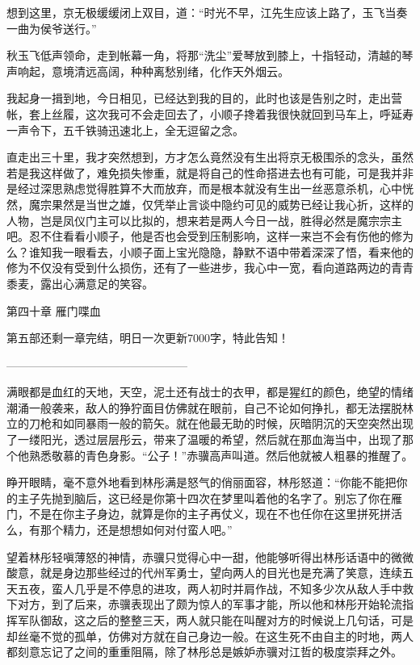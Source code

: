 想到这里，京无极缓缓闭上双目，道：“时光不早，江先生应该上路了，玉飞当奏一曲为侯爷送行。”

秋玉飞低声领命，走到帐幕一角，将那“洗尘”爱琴放到膝上，十指轻动，清越的琴声响起，意境清远高阔，种种离愁别绪，化作天外烟云。

我起身一揖到地，今日相见，已经达到我的目的，此时也该是告别之时，走出营帐，套上丝履，这次我可不会走回去了，小顺子搀着我很快就回到马车上，呼延寿一声令下，五千铁骑迅速北上，全无逗留之念。

直走出三十里，我才突然想到，方才怎么竟然没有生出将京无极围杀的念头，虽然若是我这样做了，难免损失惨重，就是将自己的性命搭进去也有可能，可是我并非是经过深思熟虑觉得胜算不大而放弃，而是根本就没有生出一丝恶意杀机，心中恍然，魔宗果然是当世之雄，仅凭举止言谈中隐约可见的威势已经让我心折，这样的人物，岂是凤仪门主可以比拟的，想来若是两人今日一战，胜得必然是魔宗宗主吧。忍不住看看小顺子，他是否也会受到压制影响，这样一来岂不会有伤他的修为么？谁知我一眼看去，小顺子面上宝光隐隐，静默不语中带着深深了悟，看来他的修为不仅没有受到什么损伤，还有了一些进步，我心中一宽，看向道路两边的青青黍麦，露出心满意足的笑容。

第四十章    雁门喋血

第五部还剩一章完结，明日一次更新7000字，特此告知！

————————————————

满眼都是血红的天地，天空，泥土还有战士的衣甲，都是猩红的颜色，绝望的情绪潮涌一般袭来，敌人的狰狞面目仿佛就在眼前，自己不论如何挣扎，都无法摆脱林立的刀枪和如同暴雨一般的箭矢。就在他最无助的时候，灰暗阴沉的天空突然出现了一缕阳光，透过层层彤云，带来了温暖的希望，然后就在那血海当中，出现了那个他熟悉敬慕的青色身影。“公子！”赤骥高声叫道。然后他就被人粗暴的推醒了。

睁开眼睛，毫不意外地看到林彤满是怒气的俏丽面容，林彤怒道：“你能不能把你的主子先抛到脑后，这已经是你第十四次在梦里叫着他的名字了。别忘了你在雁门，不是在你主子身边，就算是你的主子再仗义，现在不也任你在这里拼死拼活么，有那个精力，还是想想如何对付蛮人吧。”

望着林彤轻嗔薄怒的神情，赤骥只觉得心中一甜，他能够听得出林彤话语中的微微酸意，就是身边那些经过的代州军勇士，望向两人的目光也是充满了笑意，连续五天五夜，蛮人几乎是不停息的进攻，两人初时并肩作战，不知多少次从敌人手中救下对方，到了后来，赤骥表现出了颇为惊人的军事才能，所以他和林彤开始轮流指挥军队御敌，这之后的整整三天，两人就只能在叫醒对方的时候说上几句话，可是却丝毫不觉的孤单，仿佛对方就在自己身边一般。在这生死不由自主的时地，两人都刻意忘记了之间的重重阻隔，除了林彤总是嫉妒赤骥对江哲的极度崇拜之外。

